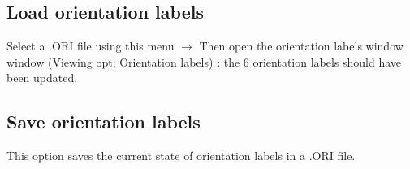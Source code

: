 \subsection{Load orientation labels}
Select a .ORI file using this menu $\rightarrow$ Then open the orientation labels window window (Viewing opt;
Orientation labels) : the 6 orientation labels should have been updated.

\subsection{Save orientation labels}
This option saves the current state of orientation labels in a .ORI file.

